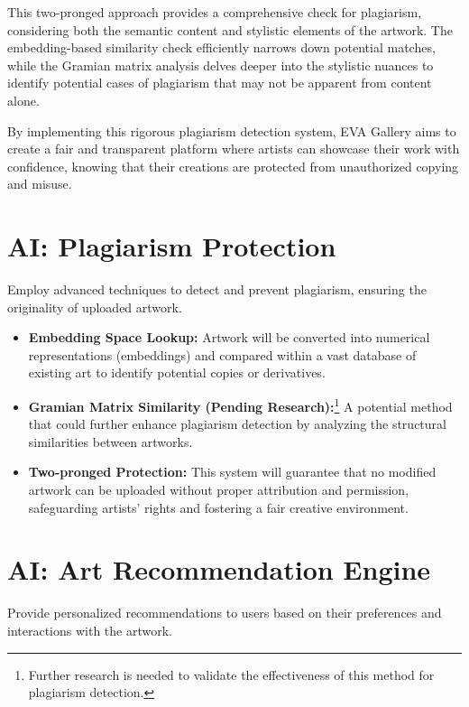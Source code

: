 This two-pronged approach provides a comprehensive check for plagiarism, considering both the semantic content and stylistic elements of the artwork. The embedding-based similarity check efficiently narrows down potential matches, while the Gramian matrix analysis delves deeper into the stylistic nuances to identify potential cases of plagiarism that may not be apparent from content alone.

By implementing this rigorous plagiarism detection system, EVA Gallery aims to create a fair and transparent platform where artists can showcase their work with confidence, knowing that their creations are protected from unauthorized copying and misuse.

\newpage
\section{AI: Plagiarism Protection}
Employ advanced techniques to detect and prevent plagiarism, ensuring the originality of uploaded artwork.

    \begin{itemize}
        \item \textbf{Embedding Space Lookup:} Artwork will be converted into numerical representations (embeddings) and compared within a vast database of existing art to identify potential copies or derivatives.
        \item \textbf{Gramian Matrix Similarity (Pending Research):}\footnote{Further research is needed to validate the effectiveness of this method for plagiarism detection.} A potential method that could further enhance plagiarism detection by analyzing the structural similarities between artworks.
        \item \textbf{Two-pronged Protection:} This system will guarantee that no modified artwork can be uploaded without proper attribution and permission, safeguarding artists' rights and fostering a fair creative environment.
    \end{itemize}

\newpage

\section{AI: Art Recommendation Engine}
Provide personalized recommendations to users based on their preferences and interactions with the artwork.

